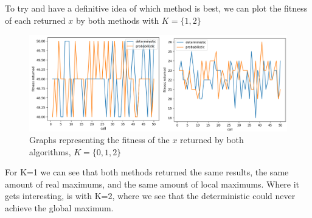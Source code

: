 \documentclass[a4paper]{article}
\begin{document}
To try and have a definitive idea of which method is best, we can plot the fitness of each returned $x$ by both methods with $K=\{1,2\}$

\begin{figure}[H]
\center
\includegraphics[width=1\textwidth]{images/proba_vs_deter.PNG}
\caption{Graphs representing the fitness of the $x$ returned by both algorithms, $K=\{0,1,2\}$}
\end{figure}
For K=1 we can see that both methods returned the same results, the same amount of real maximums, and the same amount of local maximums. Where it gets interesting, is with K=2, where we see that the deterministic could never achieve the global maximum.
\end{document}
